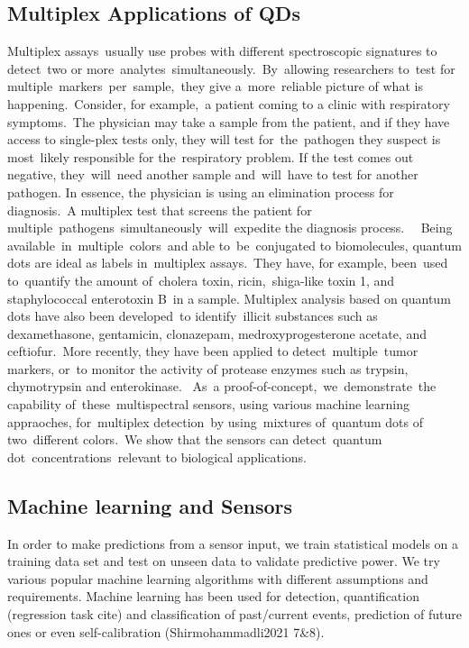 \documentclass[journal,twoside,web]{ieeecolor}
\begin{document}
\subsection{Multiplex Applications of QDs}
Multiplex assays usually use probes with different spectroscopic signatures to detect two or more analytes simultaneously. By allowing researchers to test for multiple markers per sample, they give a more reliable picture of what is happening. Consider, for example, a patient coming to a clinic with respiratory symptoms. The physician may take a sample from the patient, and if they have access to single-plex tests only, they will test for the pathogen they suspect is most likely responsible for the respiratory problem. If the test comes out negative, they will need another sample and will have to test for another pathogen. In essence, the physician is using an elimination process for diagnosis. A multiplex test that screens the patient for multiple pathogens simultaneously will expedite the diagnosis process.  
Being available in multiple colors and able to be conjugated to biomolecules, quantum dots are ideal as labels in multiplex assays. They have, for example, been used to quantify the amount of cholera toxin, ricin, shiga-like toxin 1, and staphylococcal enterotoxin B in a sample. Multiplex analysis based on quantum dots have also been developed to identify illicit substances such as dexamethasone, gentamicin, clonazepam, medroxyprogesterone acetate, and ceftiofur. More recently, they have been applied to detect multiple tumor markers, or to monitor the activity of protease enzymes such as trypsin, chymotrypsin and enterokinase.
 As a proof-of-concept, we demonstrate the capability of these multispectral sensors, using various machine learning appraoches, for multiplex detection by using mixtures of quantum dots of two different colors. We show that the sensors can detect quantum dot concentrations relevant to biological applications.  

\subsection{Machine learning and Sensors}

In order to make predictions from a sensor input, we train statistical models on a training data set and test on unseen data to validate predictive power. We try various popular machine learning algorithms with different assumptions and requirements. Machine learning has been used for detection, quantification (regression task cite) and classification of past/current events\cite{Shirmohammadli2021}, prediction of future ones or even self-calibration (Shirmohammadli2021 7\&8).  
\end{document}
